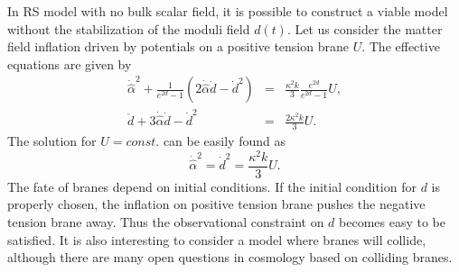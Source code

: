 \documentclass[a4paper,11pt]{article}
\begin{document}
In RS model with no bulk scalar field, it is possible 
to construct a viable model without the stabilization of the 
moduli field $d(t)$. Let us consider the matter 
field inflation driven by potentials on a positive tension brane $U$.
The effective equations are given by
\begin{eqnarray}
\dot{\hat{\alpha}}^2+\frac{1}{e^{2d}-1}(2 \dot{\hat{\alpha}}\dot{d}-\dot{d}^2)
&=& \frac{\kappa^2 k}{3} \frac{e^{2d}}{e^{2d}-1}U, \\
\ddot{d}+3 \dot{\hat{\alpha}} \dot{d}-\dot{d}^2 &=& \frac{2 \kappa^2 k}{3}U.
\end{eqnarray}
The solution for $U=const.$ can be easily found as
\begin{equation}
\dot{\hat{\alpha}}^2 = \dot{d}^2 = \frac{\kappa^2 k}{3} U.
\end{equation}
The fate of branes depend on initial conditions.
If the initial condition for $d$ is properly chosen,
the inflation on positive tension brane pushes the 
negative tension brane away. Thus the observational 
constraint on $d$ becomes easy to be satisfied. 
It is also interesting to consider a model where branes 
will collide, although there are many open questions 
in cosmology based on colliding branes.  
\end{document}
